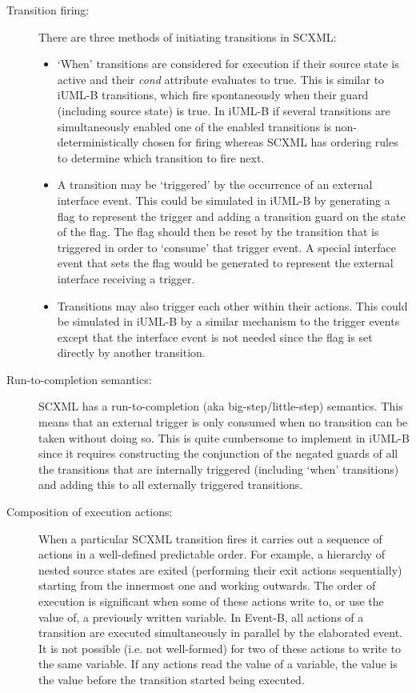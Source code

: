 \begin{description}

\item [Transition firing:]

There are three methods of initiating transitions in SCXML:
\begin{itemize}
\item `When' transitions are considered for execution if their source state is active and their \emph{cond} attribute evaluates to true. 
This is similar to iUML-B transitions, which fire spontaneously when their guard (including source state) is true.
In iUML-B if several transitions are simultaneously enabled one of the enabled transitions is non-deterministically chosen for firing whereas 
SCXML has ordering rules to determine which transition to fire next.
\item A transition may be `triggered' by the occurrence of an external interface event. 
This could be simulated in iUML-B by generating a flag to represent the trigger and adding a transition guard on the state of the flag. 
The flag should then be reset by the transition that is triggered in order to `consume' that trigger event.
 A special interface event that sets the flag would be generated to represent the external interface receiving a trigger.
\item Transitions may also trigger each other within their actions. 
This could be simulated in iUML-B by a similar mechanism to the trigger events except that the interface event is not needed since the flag is set directly by another transition.
\end{itemize}

\item [Run-to-completion semantics:] 
SCXML has a run-to-completion (aka big-step/little-step) semantics.
 This means that an external trigger is only consumed when no transition can be taken without doing so. 
This is quite cumbersome to implement in iUML-B since it requires constructing the conjunction of the negated guards of all the transitions that are internally triggered (including `when' transitions) and adding this to all externally triggered transitions.

\item [Composition of execution actions:]
When a particular SCXML transition fires it carries out a sequence of actions in a well-defined predictable order. 
For example, a hierarchy of nested source states are exited (performing their exit actions sequentially) starting from the innermost one and working outwards.
The order of execution is significant when some of these actions write to, or use the value of, a previously written variable. 
In Event-B, all actions of a transition are executed simultaneously in parallel by the elaborated event. 
It  is not possible (i.e. not well-formed) for two of these actions to write to the same variable.
If any actions read the value of a variable, the value is the value before the transition started being executed.


\end{description}
